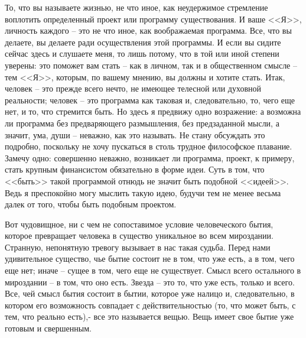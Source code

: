 То, что вы называете жизнью, не что иное, как неудержимое стремление воплотить 
определенный проект или программу существования. И ваше <<Я>>, личность 
каждого -- это не что иное, как воображаемая программа. Все, что вы делаете, 
вы делаете ради осуществления этой программы. И если вы сидите сейчас здесь 
и слушаете меня, то лишь потому, что в той или иной степени уверены: это 
поможет вам стать -- как в личном, так и в общественном смысле -- тем <<Я>>, 
которым, по вашему мнению, вы должны и хотите стать. Итак, человек -- это 
прежде всего нечто, не имеющее телесной или духовной реальности; человек -- 
это программа как таковая и, следовательно, то, чего еще нет, и то, что 
стремится быть. Но здесь я предвижу одно возражение: а возможна ли программа 
без предваряющего размышления, без предзаданной мысли, а значит, ума, души -- 
неважно, как это называть. Не стану обсуждать это подробно, поскольку не хочу 
пускаться в столь трудное философское плавание. Замечу одно: совершенно 
неважно, возникает ли программа, проект, к примеру, стать крупным финансистом 
обязательно в форме идеи. Суть в том, что <<быть>> такой программой отнюдь не 
значит быть подобной <<идеей>>. Ведь я преспокойно могу мыслить такую идею, 
будучи тем не менее весьма далек от того, чтобы быть подобным проектом.

Вот чудовищное, ни с чем не сопоставимое условие человеческого бытия, которое 
превращает человека в существо уникальное во всем мироздании. Странную, 
непонятную тревогу вызывает в нас такая судьба. Перед нами удивительное 
существо, чье бытие состоит не в том, что уже есть, а в том, чего еще нет; 
иначе -- сущее в том, чего еще не существует. Смысл всего остального в 
мироздании -- в том, что оно есть. Звезда -- это то, что уже есть, только и 
всего. Все, чей смысл бытия состоит в бытии, которое уже налицо и, 
следовательно, в котором его возможность совпадает с действительностью (то, 
что может быть, с тем, что реально есть),- все это называется вещью. Вещь 
имеет свое бытие уже готовым и свершенным.

